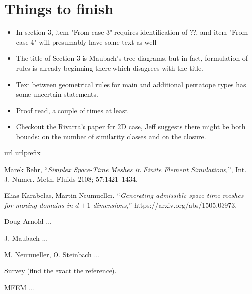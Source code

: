 \documentclass[a4paper,12pt]{amsart}
\numberwithin{equation}{section}
\begin{document}
\section{Things to finish}
\begin{itemize}
	\item In section 3, item "From case 3" requires identification of ??, and item "From case 4" will presumably have some text as well
	\item The title of Section 3 is Maubach's tree diagrams, but in fact, formulation of rules is already beginning there which disagrees with the title.
	\item Text between geometrical rules for main and additional pentatope types has some uncertain statements.
	\item Proof read, a couple of times at least
	\item Checkout the Rivarra's paper for 2D case, Jeff suggests there might be both bounds: on the number of similarity classes and on the closure.

\end{itemize}



\begin{thebibliography}{99}
\expandafter\ifx\csname url\endcsname\relax
  \def\url#1{\texttt{#1}}\fi
\expandafter\ifx\csname urlprefix\endcsname\relax\def\urlprefix{URL }\fi

Marek Behr, ``{\em Simplex Space-Time Meshes in Finite Element Simulations,}'',
Int. J. Numer. Meth. Fluids 2008; 57:1421–1434.

Elias Karabelas, Martin Neumueller. 
``{\em Generating admissible space-time meshes for moving domains in $d + 1$-dimensions,}''
https://arxiv.org/abs/1505.03973.


Doug Arnold ...

J. Maubach ...

M. Neumueller, O. Steinbach ...

Survey (find the exact the reference).

MFEM ...

\end{thebibliography}
\end{document}
